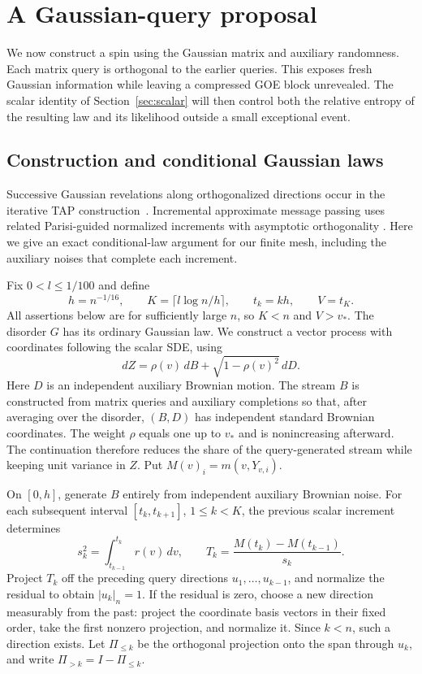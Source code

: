 \section{A Gaussian-query proposal}\label{sec:proposal}

We now construct a spin using the Gaussian matrix and auxiliary
randomness. Each matrix query is orthogonal to the earlier queries.
This exposes fresh Gaussian information while leaving a compressed GOE
block unrevealed. The scalar identity of Section~\ref{sec:scalar} will
then control both the relative entropy of the resulting law and its
likelihood outside a small exceptional event.

\subsection{Construction and conditional Gaussian laws}

Successive Gaussian revelations along orthogonalized directions occur
in the iterative TAP construction~\cite[Sections~2--3]{Bolthausen2014}.
Incremental approximate message passing uses related Parisi-guided
normalized increments with asymptotic orthogonality
\cite[Sections~2--3]{Montanari2021}. Here we give an exact
conditional-law argument for our finite mesh, including the auxiliary
noises that complete each increment.

Fix $0<l\le1/100$ and define
\[
 h=n^{-1/16},\qquad K=\lceil l\log n/h\rceil,\qquad
 t_k=kh,\qquad V=t_K.
\]
All assertions below are for sufficiently large $n$, so $K<n$ and
$V>v_*$. The disorder $G$ has its ordinary Gaussian law. We construct
a vector process with coordinates following the scalar SDE, using
\[
 dZ=\rho(v)\,dB+\sqrt{1-\rho(v)^2}\,dD.
 \tag{4}\label{eq:4}
\]
Here $D$ is an independent auxiliary Brownian motion. The stream $B$
is constructed from matrix queries and auxiliary completions so that,
after averaging over the disorder, $(B,D)$ has independent standard
Brownian coordinates. The weight $\rho$ equals one up to $v_*$ and
is nonincreasing afterward. The continuation therefore reduces the
share of the query-generated stream while keeping unit variance in
$Z$. Put $M(v)_i=m(v,Y_{v,i})$.

On $[0,h]$, generate $B$ entirely from independent auxiliary Brownian
noise. For each subsequent interval $[t_k,t_{k+1}]$, $1\le k<K$,
the previous scalar increment determines
\[
 s_k^2=\int_{t_{k-1}}^{t_k}r(v)\,dv,
 \qquad T_k=\frac{M(t_k)-M(t_{k-1})}{s_k}.
\]
Project $T_k$ off the preceding query directions $u_1,\ldots,u_{k-1}$,
and normalize the residual to obtain $|u_k|_n=1$. If the residual is
zero, choose a new direction measurably from the past: project the
coordinate basis vectors in their fixed order, take the first nonzero
projection, and normalize it. Since $k<n$, such a direction exists.
Let $\Pi_{\le k}$ be the orthogonal projection onto the span through
$u_k$, and write $\Pi_{>k}=I-\Pi_{\le k}$.

